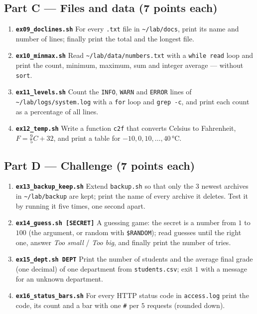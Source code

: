 \documentclass[11pt,a4paper]{article}
\newcommand{\cmd}[1]{\texttt{#1}}
\begin{document}
\subsection*{Part C --- Files and data (7 points each)}
\begin{enumerate}[leftmargin=1.6em,resume]
  \item \textbf{\texttt{ex09\_doclines.sh}} For every \texttt{.txt} file in \texttt{\textasciitilde/lab/docs}, print its name and number of lines; finally print the total and the longest file.
  \item \textbf{\texttt{ex10\_minmax.sh}} Read \texttt{\textasciitilde/lab/data/numbers.txt} with a \texttt{while read} loop and print the count, minimum, maximum, sum and integer average --- without \cmd{sort}.
  \item \textbf{\texttt{ex11\_levels.sh}} Count the \texttt{INFO}, \texttt{WARN} and \texttt{ERROR} lines of \texttt{\textasciitilde/lab/logs/system.log} with a \texttt{for} loop and \cmd{grep -c}, and print each count as a percentage of all lines.
  \item \textbf{\texttt{ex12\_temp.sh}} Write a function \texttt{c2f} that converts Celsius to Fahrenheit, $F = \frac{9}{5}C + 32$, and print a table for $-10, 0, 10, \ldots, 40$\,°C.
\end{enumerate}

\subsection*{Part D --- Challenge (7 points each)}
\begin{enumerate}[leftmargin=1.6em,resume]
  \item \textbf{\texttt{ex13\_backup\_keep.sh}} Extend \texttt{backup.sh} so that only the $3$ newest archives in \texttt{\textasciitilde/lab/backup} are kept; print the name of every archive it deletes. Test it by running it five times, one second apart.
  \item \textbf{\texttt{ex14\_guess.sh [SECRET]}} A guessing game: the secret is a number from $1$ to $100$ (the argument, or random with \texttt{\$RANDOM}); read guesses until the right one, answer \emph{Too small} / \emph{Too big}, and finally print the number of tries.
  \item \textbf{\texttt{ex15\_dept.sh DEPT}} Print the number of students and the average final grade (one decimal) of one department from \texttt{students.csv}; exit $1$ with a message for an unknown department.
  \item \textbf{\texttt{ex16\_status\_bars.sh}} For every HTTP status code in \texttt{access.log} print the code, its count and a bar with one \texttt{\#} per $5$ requests (rounded down).
\end{enumerate}
\end{document}
